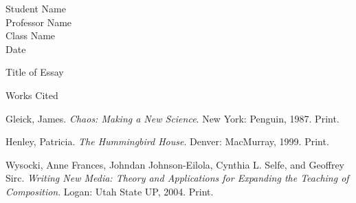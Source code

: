 \documentclass[12pt]{article}
\newcommand{\bibent}{\noindent \hangindent 40pt}
\newenvironment{workscited}{\newpage \begin{center} Works Cited \end{center}}{\newpage }
\begin{document}
\begin{flushleft}
Student Name \\
Professor Name \\
Class Name \\
Date \\

\begin{center}
Title of Essay
\end{center}

\setlength{\parindent}{0.5in} 


\lipsum[1-6] %


\begin{workscited}

\bibent
Gleick, James. \textit{Chaos: Making a New Science}. New York: Penguin, 1987. Print.

\bibent
Henley, Patricia. \textit{The Hummingbird House}. Denver: MacMurray, 1999. Print.

\bibent
Wysocki, Anne Frances, Johndan Johnson-Eilola, Cynthia L. Selfe, and Geoffrey Sirc. \textit{Writing New Media: Theory and Applications for Expanding the Teaching of Composition}. Logan: Utah State UP, 2004. Print.

\end{workscited}
\end{flushleft}
\end{document}
